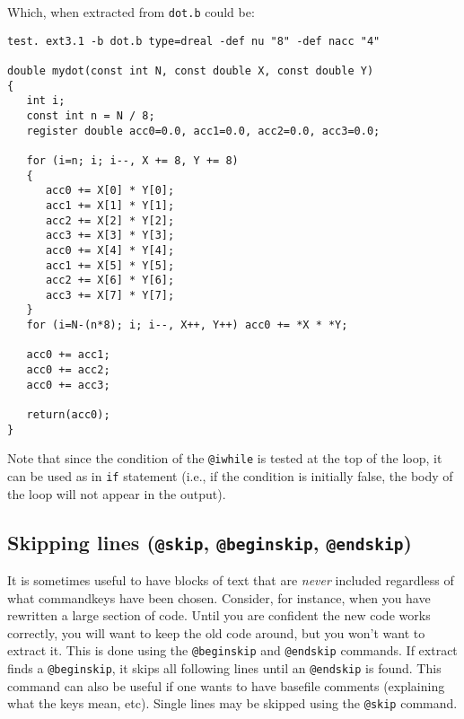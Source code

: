 Which, when extracted from {\tt dot.b} could be:
\begin{verbatim}
test. ext3.1 -b dot.b type=dreal -def nu "8" -def nacc "4"

double mydot(const int N, const double X, const double Y)
{
   int i;
   const int n = N / 8;
   register double acc0=0.0, acc1=0.0, acc2=0.0, acc3=0.0;

   for (i=n; i; i--, X += 8, Y += 8)
   {
      acc0 += X[0] * Y[0];
      acc1 += X[1] * Y[1];
      acc2 += X[2] * Y[2];
      acc3 += X[3] * Y[3];
      acc0 += X[4] * Y[4];
      acc1 += X[5] * Y[5];
      acc2 += X[6] * Y[6];
      acc3 += X[7] * Y[7];
   }
   for (i=N-(n*8); i; i--, X++, Y++) acc0 += *X * *Y;

   acc0 += acc1;
   acc0 += acc2;
   acc0 += acc3;

   return(acc0);
}
\end{verbatim}

Note that since the condition of the {\tt @iwhile} is tested at the top of
the loop, it can be used as in {\tt if} statement (i.e., if the condition
is initially false, the body of the loop will not appear in the output).

\subsection{Skipping lines ({\tt @skip}, {\tt @beginskip}, {\tt @endskip})}
It is sometimes useful to have blocks of text that are {\em never} included
regardless of what commandkeys have been chosen.  Consider, for instance,
when you have rewritten a large section of code.  Until you are confident
the new code works correctly, you will want to keep the old code around,
but you won't want to extract it.  This is done using the 
{\tt @beginskip} and {\tt @endskip} commands.  
If extract finds a {\tt @beginskip},
it skips all following lines until an {\tt @endskip} is found.  This command
can also be useful if one wants to have basefile comments (explaining
what the keys mean, etc).
Single lines may be skipped using the {\tt @skip} command.

